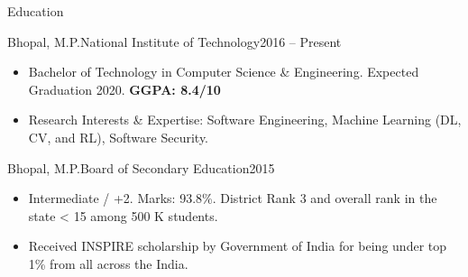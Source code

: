 \documentclass[]{mcdowellcv}
\begin{document}
	\makeheader
	
	
	\begin{cvsection}{Education}
		\begin{cvsubsection}{Bhopal, M.P.}{National Institute of Technology}{2016 -- Present}
			\begin{itemize}
				\item Bachelor of Technology in Computer Science \& Engineering. Expected Graduation 2020. \textbf{GGPA: 8.4/10}
				
				\item Research Interests \& Expertise: Software Engineering, Machine Learning (DL, CV, and RL), Software Security.
				
				
			\end{itemize}
		\end{cvsubsection}
	
	\begin{cvsubsection}{Bhopal, M.P.}{Board of Secondary Education}{2015}
		\begin{itemize}
			\item Intermediate / +2.  Marks: 93.8\%. District Rank 3 and overall rank in the state < 15 among 500 K students.
			
			\item Received INSPIRE scholarship by Government of India for being under top 1\% from all across the India. 
			
		\end{itemize}
	\end{cvsubsection}

	\end{cvsection}
	
\end{document}
